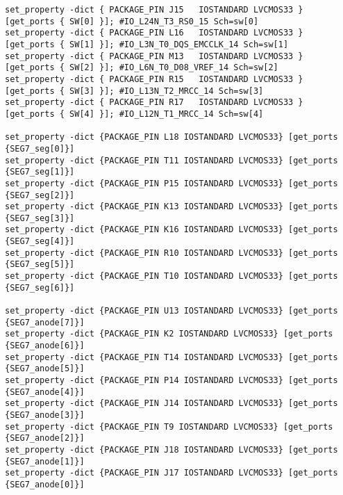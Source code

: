 \begin{verbatim}
set_property -dict { PACKAGE_PIN J15   IOSTANDARD LVCMOS33 } [get_ports { SW[0] }]; #IO_L24N_T3_RS0_15 Sch=sw[0]
set_property -dict { PACKAGE_PIN L16   IOSTANDARD LVCMOS33 } [get_ports { SW[1] }]; #IO_L3N_T0_DQS_EMCCLK_14 Sch=sw[1]
set_property -dict { PACKAGE_PIN M13   IOSTANDARD LVCMOS33 } [get_ports { SW[2] }]; #IO_L6N_T0_D08_VREF_14 Sch=sw[2]
set_property -dict { PACKAGE_PIN R15   IOSTANDARD LVCMOS33 } [get_ports { SW[3] }]; #IO_L13N_T2_MRCC_14 Sch=sw[3]
set_property -dict { PACKAGE_PIN R17   IOSTANDARD LVCMOS33 } [get_ports { SW[4] }]; #IO_L12N_T1_MRCC_14 Sch=sw[4]

set_property -dict {PACKAGE_PIN L18 IOSTANDARD LVCMOS33} [get_ports {SEG7_seg[0]}]
set_property -dict {PACKAGE_PIN T11 IOSTANDARD LVCMOS33} [get_ports {SEG7_seg[1]}]
set_property -dict {PACKAGE_PIN P15 IOSTANDARD LVCMOS33} [get_ports {SEG7_seg[2]}]
set_property -dict {PACKAGE_PIN K13 IOSTANDARD LVCMOS33} [get_ports {SEG7_seg[3]}]
set_property -dict {PACKAGE_PIN K16 IOSTANDARD LVCMOS33} [get_ports {SEG7_seg[4]}]
set_property -dict {PACKAGE_PIN R10 IOSTANDARD LVCMOS33} [get_ports {SEG7_seg[5]}]
set_property -dict {PACKAGE_PIN T10 IOSTANDARD LVCMOS33} [get_ports {SEG7_seg[6]}]

set_property -dict {PACKAGE_PIN U13 IOSTANDARD LVCMOS33} [get_ports {SEG7_anode[7]}]
set_property -dict {PACKAGE_PIN K2 IOSTANDARD LVCMOS33} [get_ports {SEG7_anode[6]}]
set_property -dict {PACKAGE_PIN T14 IOSTANDARD LVCMOS33} [get_ports {SEG7_anode[5]}]
set_property -dict {PACKAGE_PIN P14 IOSTANDARD LVCMOS33} [get_ports {SEG7_anode[4]}]
set_property -dict {PACKAGE_PIN J14 IOSTANDARD LVCMOS33} [get_ports {SEG7_anode[3]}]
set_property -dict {PACKAGE_PIN T9 IOSTANDARD LVCMOS33} [get_ports {SEG7_anode[2]}]
set_property -dict {PACKAGE_PIN J18 IOSTANDARD LVCMOS33} [get_ports {SEG7_anode[1]}]
set_property -dict {PACKAGE_PIN J17 IOSTANDARD LVCMOS33} [get_ports {SEG7_anode[0]}]
\end{verbatim}
